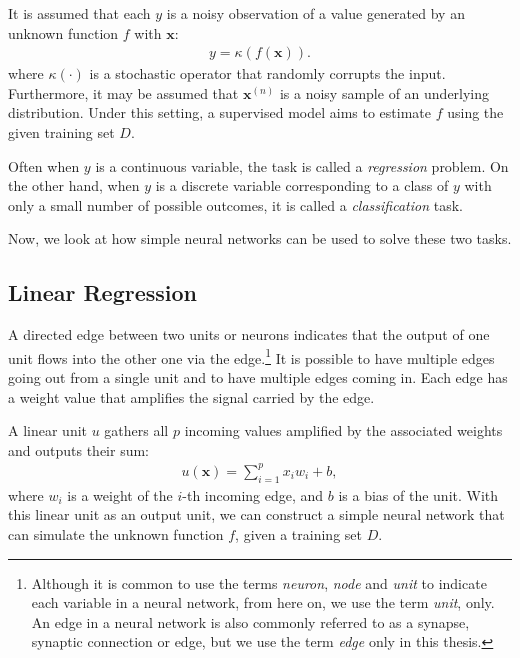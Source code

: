 \documentclass{now}
\newcommand{\vect}[1]{\mathbf{#1}}
\newcommand{\vx}[0]{\vect{x}}
\begin{document}
It is assumed that each $y$ is a noisy observation of a value generated by an
unknown function $f$ with $\vx$:
\begin{align}
    \label{eq:linreg_gen}
    y = \kappa(f(\vx)).
\end{align}
where $\kappa(\cdot)$ is a stochastic operator that randomly corrupts the
input.  Furthermore, it may be assumed that $\vx^{(n)}$ is a noisy sample of an
underlying distribution.  Under this setting, a supervised model aims to
estimate $f$ using the given training set $D$.

Often when $y$ is a continuous variable, the task is called a
\textit{regression} problem.  On the other hand, when $y$ is a discrete
variable corresponding to a class of $y$ with only a small number of possible
outcomes, it is called a \textit{classification} task.

Now, we look at how simple neural networks can be used to solve these two
tasks.

\subsection{Linear Regression}
\label{sec:linear_regression}

A directed edge between two units or neurons indicates that the output of one
unit flows into the other one via the edge.\footnote{
    Although it is common to use the terms \textit{neuron}, \textit{node} and
    \textit{unit} to indicate each variable in a neural network, from here on,
    we use the term \textit{unit}, only. An edge in a neural network is also
    commonly referred to as a synapse, synaptic connection or edge, but we use
    the term \textit{edge} only in this thesis.
}
It is possible to have multiple edges going out from a single unit and to have
multiple edges coming in.  Each edge has a weight value that amplifies the
signal carried by the edge.

A linear unit $u$ gathers all $p$ incoming values amplified by the associated
weights and outputs their sum:
\begin{align}
    \label{eq:linear_unit}
    u(\vx) = \sum_{i=1}^p x_i w_i + b, 
\end{align}
where $w_i$ is a weight of the $i$-th incoming edge, and $b$ is a bias of the
unit.  With this linear unit as an output unit, we can construct a simple
neural network that can simulate the unknown function $f$, given a training set
$D$. 
\end{document}
